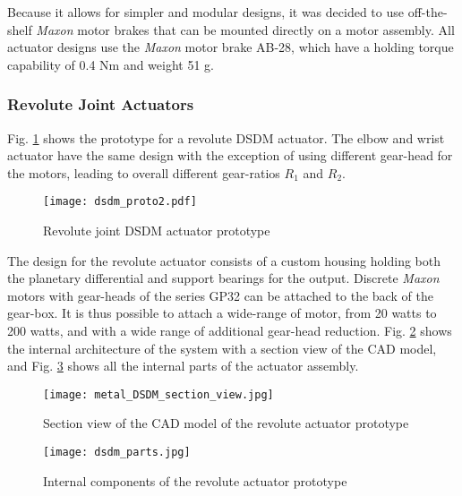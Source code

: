 Because it allows for simpler and modular designs, it was decided to use off-the-shelf \textit{Maxon} motor brakes that can be mounted directly on a motor assembly. All actuator designs use the \textit{Maxon} motor brake AB-28, which have a holding torque capability of 0.4 Nm and weight 51 g. 


\subsubsection{Revolute Joint Actuators}

Fig. \ref{fig:dsdm_act} shows the prototype for a revolute DSDM actuator. The elbow and wrist actuator have the same design with the exception of using different gear-head for the motors, leading to overall different gear-ratios $R_1$ and $R_2$.
%
\begin{figure}[htp]
	\centering
		\texttt{[image: dsdm\_proto2.pdf]}
	\caption{Revolute joint DSDM actuator prototype } %
	\label{fig:dsdm_act}
\end{figure}
%
The design for the revolute actuator consists of a custom housing holding both the planetary differential and support bearings for the output. Discrete \textit{Maxon} motors with gear-heads of the series GP32 can be attached to the back of the gear-box. It is thus possible to attach a wide-range of motor, from 20 watts to 200 watts, and with a wide range of additional gear-head reduction. Fig. \ref{fig:dsdm_section} shows the internal architecture of the system with a section view of the CAD model, and Fig. \ref{fig:dsdm_parts} shows all the internal parts of the actuator assembly. 

\begin{figure}[htp]
	\centering
		\texttt{[image: metal\_DSDM\_section\_view.jpg]}
	\caption{Section view of the CAD model of the revolute actuator prototype} %
	\label{fig:dsdm_section}
\end{figure}

\begin{figure}[htbp]
	\centering
		\texttt{[image: dsdm\_parts.jpg]}
	\caption{Internal components of the revolute actuator prototype}
	\label{fig:dsdm_parts}
\end{figure}

